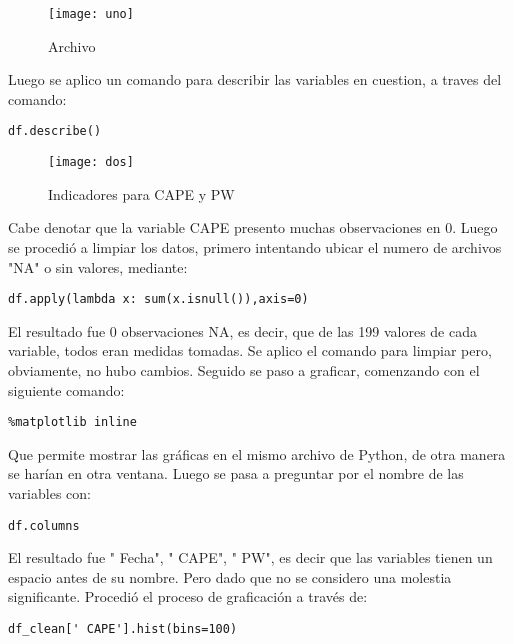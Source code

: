 \documentclass[12pt,letterpaper]{article}
\begin{document}
\begin{figure}[H]
\begin{center}
\texttt{[image: uno]}
\end{center}
\caption{Archivo}
\end{figure}

Luego se aplico un comando para describir las variables en cuestion, a traves del comando:\\

\begin{verbatim}
df.describe()
\end{verbatim}

\begin{figure}[H]
\begin{center}
\texttt{[image: dos]}
\end{center}
\caption{Indicadores para CAPE y PW}
\end{figure}

Cabe denotar que la variable CAPE presento muchas observaciones en 0. Luego se procedió a limpiar los datos, primero intentando ubicar el numero de archivos "NA" o sin valores, mediante:

\begin{verbatim}
df.apply(lambda x: sum(x.isnull()),axis=0)
\end{verbatim}

El resultado fue 0 observaciones NA, es decir, que de las 199 valores de cada variable, todos eran medidas tomadas. Se aplico el comando para limpiar pero, obviamente, no hubo cambios. Seguido se paso a graficar, comenzando con el siguiente comando:

\begin{verbatim}
%matplotlib inline
\end{verbatim}

Que permite mostrar las gráficas en el mismo archivo de Python, de otra manera se harían en otra ventana. Luego se pasa a preguntar por el nombre de las variables con:
\begin{verbatim}
df.columns
\end{verbatim}
El resultado fue " Fecha", " CAPE", " PW", es decir que las variables tienen un espacio antes de su nombre. Pero dado que no se considero una molestia significante. Procedió el proceso de graficación a través de:

\begin{verbatim}
df_clean[' CAPE'].hist(bins=100)
\end{verbatim}
\end{document}
